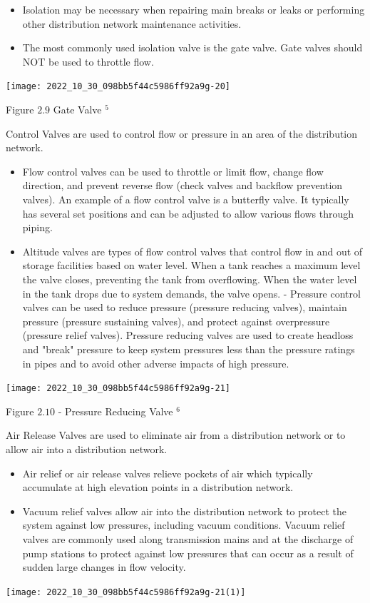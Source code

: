 \documentclass[10pt]{article}
\begin{document}
\begin{itemize}
  \item Isolation may be necessary when repairing main breaks or leaks or performing other distribution network maintenance activities.

  \item The most commonly used isolation valve is the gate valve. Gate valves should NOT be used to throttle flow.

\end{itemize}
\texttt{[image: 2022\_10\_30\_098bb5f44c5986ff92a9g-20]}

Figure $2.9$ Gate Valve ${ }^{5}$

Control Valves are used to control flow or pressure in an area of the distribution network.

\begin{itemize}
  \item Flow control valves can be used to throttle or limit flow, change flow direction, and prevent reverse flow (check valves and backflow prevention valves). An example of a flow control valve is a butterfly valve. It typically has several set positions and can be adjusted to allow various flows through piping.

  \item Altitude valves are types of flow control valves that control flow in and out of storage facilities based on water level. When a tank reaches a maximum level the valve closes, preventing the tank from overflowing. When the water level in the tank drops due to system demands, the valve opens. - Pressure control valves can be used to reduce pressure (pressure reducing valves), maintain pressure (pressure sustaining valves), and protect against overpressure (pressure relief valves). Pressure reducing valves are used to create headloss and "break" pressure to keep system pressures less than the pressure ratings in pipes and to avoid other adverse impacts of high pressure.

\end{itemize}
\texttt{[image: 2022\_10\_30\_098bb5f44c5986ff92a9g-21]}

Figure $2.10$ - Pressure Reducing Valve ${ }^{6}$

Air Release Valves are used to eliminate air from a distribution network or to allow air into a distribution network.

\begin{itemize}
  \item Air relief or air release valves relieve pockets of air which typically accumulate at high elevation points in a distribution network.

  \item Vacuum relief valves allow air into the distribution network to protect the system against low pressures, including vacuum conditions. Vacuum relief valves are commonly used along transmission mains and at the discharge of pump stations to protect against low pressures that can occur as a result of sudden large changes in flow velocity.

\end{itemize}
\texttt{[image: 2022\_10\_30\_098bb5f44c5986ff92a9g-21(1)]}
\end{document}
